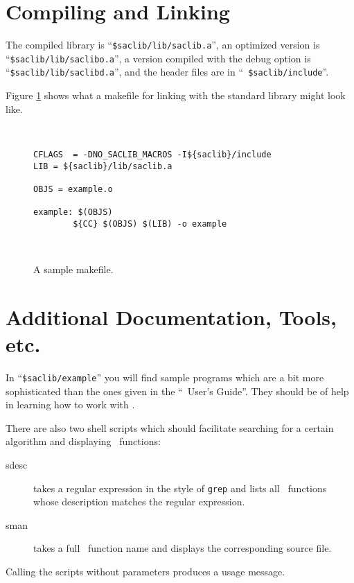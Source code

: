 \section{Compiling and Linking}

\sloppy

The compiled library is ``{\tt \$saclib/lib/saclib.a}'', an optimized version
is ``{\tt \$saclib/lib/saclibo.a}'', a version compiled with the debug option
is ``{\tt \$saclib/lib/saclibd.a}'', and the header files are in ``{\tt
\$saclib/include}''.

Figure \ref{fMF} shows what a makefile for linking with the standard
library might look like.

\begin{figure}[htb]
\ \hrulefill\ \small
\begin{verbatim}
CFLAGS  = -DNO_SACLIB_MACROS -I${saclib}/include
LIB = ${saclib}/lib/saclib.a

OBJS = example.o

example: $(OBJS)
        ${CC} $(OBJS) $(LIB) -o example
\end{verbatim}
\ \hrulefill\ \normalsize
\caption{A sample makefile.}
\label{fMF}
\end{figure}

\fussy

\section{Additional Documentation, Tools, etc.}

In ``{\tt \$saclib/example}'' you will find sample programs which are a bit
more sophisticated than the ones given in the ``\saclib\ User's Guide''. They
should be of help in learning how to work with \saclib.

There are also two shell scripts which should facilitate searching for a
certain algorithm and displaying \saclib\ functions:
\begin{description}
\item[sdesc]
  takes a regular expression in the style of {\tt grep} and lists all
  \saclib\ functions whose description matches the regular expression.
\item[sman]
  takes a full \saclib\ function name and displays the corresponding source
  file.
\end{description}
Calling the scripts without parameters produces a usage message.

